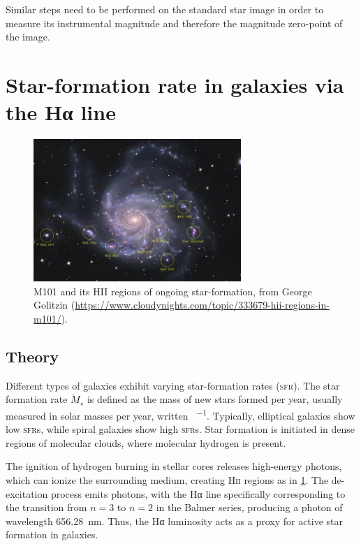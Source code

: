\documentclass[a4paper, 11pt, fleqn]{memoir}
\begin{document}
Similar steps need to be performed on the standard star image in order to measure its instrumental magnitude and therefore the magnitude zero-point of the image.

\section{Star-formation rate in galaxies via the Hα line}
\label{sec:star-formation-rate}

\begin{figure}
    \centering
    \includegraphics[width=0.7\textwidth]{m101.jpg}
    \caption{M101 and its HII regions of ongoing star-formation, from George Golitzin (\url{https://www.cloudynights.com/topic/333679-hii-regions-in-m101/}).}
    \label{fig:hiiregions}
\end{figure}

\subsection{Theory}
Different types of galaxies exhibit varying star-formation rates (\textsc{sfr}).
The star formation rate $\dot{M}_\star$ is defined as the mass of new stars formed per year,
usually measured in solar masses per year, written \si{\Msun\per\year}.
Typically, elliptical galaxies show low \textsc{sfr}s, while spiral galaxies show high \textsc{sfr}s.
Star formation is initiated in dense regions of molecular clouds, where molecular hydrogen is present.

The ignition of hydrogen burning in stellar cores releases high-energy photons, which can ionize the surrounding medium, creating H\textsc{ii} regions as in \cref{fig:hiiregions}.
The de-excitation process emits photons, with the Hα line specifically corresponding to the transition from $n=3$ to $n=2$ in the Balmer series, producing a photon of wavelength \SI{656.28}{\nano\meter}.
Thus, the Hα luminosity acts as a proxy for active star formation in galaxies.
\end{document}
